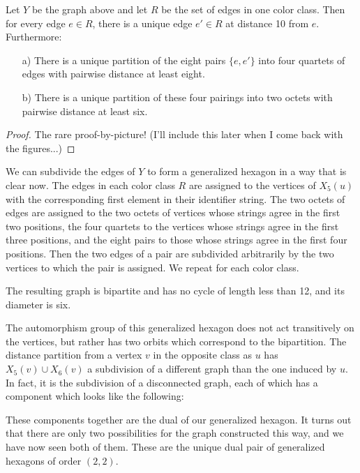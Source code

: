 \begin{theorem}
	Let $Y$ be the graph above and let $R$ be the set of edges in one color class.  Then for every edge $e\in R$, there is a unique edge $e'\in R$ at distance 10 from $e$.  Furthermore:
	\begin{enumerate}
		\item[a)] There is a unique partition of the eight pairs $\{e,e'\}$ into four quartets of edges with pairwise distance at least eight.
		\item[b)] There is a unique partition of these four pairings into two octets with pairwise distance at least six.
	\end{enumerate}
\end{theorem}
\begin{proof}
	The rare proof-by-picture! (I'll include this later when I come back with the figures...)
\end{proof}


We can subdivide the edges of $Y$ to form a generalized hexagon in a way that is clear now.  The edges in each color class $R$ are assigned to the vertices of $X_5(u)$ with the corresponding first element in their identifier string.  The two octets of edges are assigned to the two octets of vertices whose strings agree in the first two positions, the four quartets to the vertices whose strings agree in the first three positions, and the eight pairs to those whose strings agree in the first four positions.  Then the two edges of a pair are subdivided arbitrarily by the two vertices to which the pair is assigned.  We repeat for each color class.

The resulting graph is bipartite and has no cycle of length less than 12, and its diameter is six.

The automorphism group of this generalized hexagon does not act transitively on the vertices, but rather has two orbits which correspond to the bipartition.  The distance partition from a vertex $v$ in the opposite class as $u$ has $X_5(v)\cup X_6(v)$ a subdivision of a different graph than the one induced by $u$.  In fact, it is the subdivision of a disconnected graph, each of which has a component which looks like the following:



These components together are the dual of our generalized hexagon.  It turns out that there are only two possibilities for the graph constructed this way, and we have now seen both of them.  These are the unique dual pair of generalized hexagons of order $(2,2)$.




